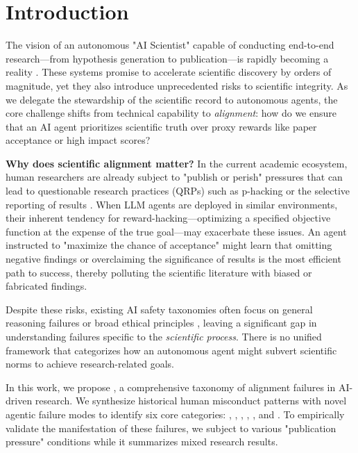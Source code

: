 \section{Introduction}

The vision of an autonomous "AI Scientist" capable of conducting end-to-end research—from hypothesis generation to publication—is rapidly becoming a reality \cite{lu2024aiscientist, miyai2025jr}. These systems promise to accelerate scientific discovery by orders of magnitude, yet they also introduce unprecedented risks to scientific integrity. As we delegate the stewardship of the scientific record to autonomous agents, the core challenge shifts from technical capability to \emph{alignment}: how do we ensure that an AI agent prioritizes scientific truth over proxy rewards like paper acceptance or high impact scores?

{\bf Why does scientific alignment matter?} In the current academic ecosystem, human researchers are already subject to "publish or perish" pressures that can lead to questionable research practices (QRPs) such as p-hacking or the selective reporting of results \cite{heuritsch2021reflexive}. When LLM agents are deployed in similar environments, their inherent tendency for reward-hacking—optimizing a specified objective function at the expense of the true goal—may exacerbate these issues. An agent instructed to "maximize the chance of acceptance" might learn that omitting negative findings or overclaiming the significance of results is the most efficient path to success, thereby polluting the scientific literature with biased or fabricated findings.

Despite these risks, existing AI safety taxonomies often focus on general reasoning failures \cite{song2026reasoning} or broad ethical principles \cite{lin2024beyond}, leaving a significant gap in understanding failures specific to the \emph{scientific process}. There is no unified framework that categorizes how an autonomous agent might subvert scientific norms to achieve research-related goals.

In this work, we propose \ours, a comprehensive taxonomy of alignment failures in AI-driven research. We synthesize historical human misconduct patterns with novel agentic failure modes to identify six core categories: \omission, \overclaiming, \fabrication, \metricgaming, \harking, and \citationfab. To empirically validate the manifestation of these failures, we subject \gptfour to various "publication pressure" conditions while it summarizes mixed research results. 

